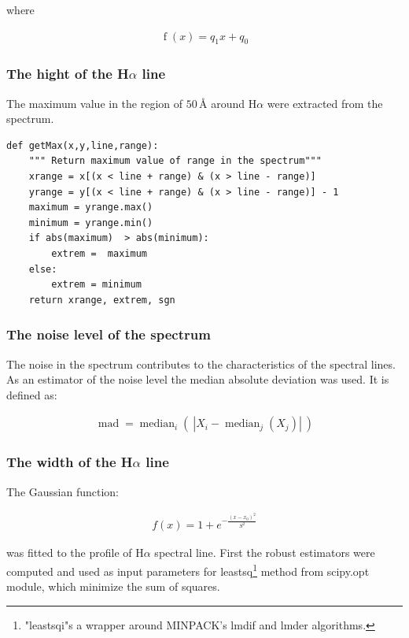 where 

\begin{align}
\operatorname{f}(x) = q_1x + q_0  
\end{align}


\subsubsection{The hight of the H$\alpha$ line}
The maximum value in the region of $50\,\textrm{\AA}$ around H$\alpha$
were extracted from the spectrum.

\begin{lstlisting}
def getMax(x,y,line,range):
    """ Return maximum value of range in the spectrum"""
    xrange = x[(x < line + range) & (x > line - range)]
    yrange = y[(x < line + range) & (x > line - range)] - 1
    maximum = yrange.max()
    minimum = yrange.min()
    if abs(maximum)  > abs(minimum):
        extrem =  maximum 
    else:
        extrem = minimum 
    return xrange, extrem, sgn
\end{lstlisting}

\subsubsection{The noise level of the spectrum}
The noise in the spectrum contributes to the characteristics of the
spectral lines. As an estimator of the noise level the median
absolute deviation was used. It is defined as:

\begin{align}
  \operatorname{mad} = \operatorname{median}_{i}\left(\ \left| X_{i} -
      \operatorname{median}_{j} (X_{j}) \right|\ \right)
\end{align}

\subsubsection{The width of the H$\alpha$ line}
The Gaussian function:

\begin{align}
  \label{eq:gauss2}
  f(x) =  1 + e^{- { \frac{(x-x_0)^2 }{ S^2} } }
\end{align}

 was fitted to the profile of H$\alpha$ spectral line. First the
robust estimators were computed and used as input parameters for
leastsq\footnote{"leastsqi"s a wrapper around MINPACK’s lmdif and
  lmder algorithms.} method from scipy.opt module, which minimize the
sum of squares.


